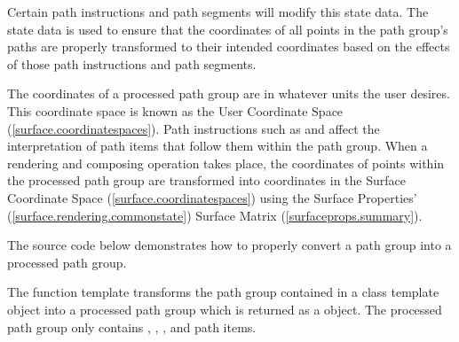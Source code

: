 \pnum
Certain path instructions and path segments will modify this state data. The state data is used to ensure that the coordinates of all points in the path group's paths are properly transformed to their intended coordinates based on the effects of those path instructions and path segments.

\pnum
\enternote
The coordinates of a processed path group are in whatever units the user desires. This coordinate space is known as the User Coordinate Space (\ref{surface.coordinatespaces}). Path instructions such as  and  affect the interpretation of path items that follow them within the path group. When a rendering and composing operation takes place, the coordinates of points within the processed path group are transformed into coordinates in the Surface Coordinate Space (\ref{surface.coordinatespaces}) using the Surface Properties' (\ref{surface.rendering.commonstate}) Surface Matrix (\ref{surfaceprops.summary}).
\exitnote

\pnum
The source code below demonstrates how to properly convert a path group into a processed path group.

\pnum
The  function template transforms the path group contained in a  class template object into a processed path group which is returned as a  object. The processed path group only contains , , , and  path items.



\addtocounter{SectionDepthBase}{1}




















\addtocounter{SectionDepthBase}{-1}

